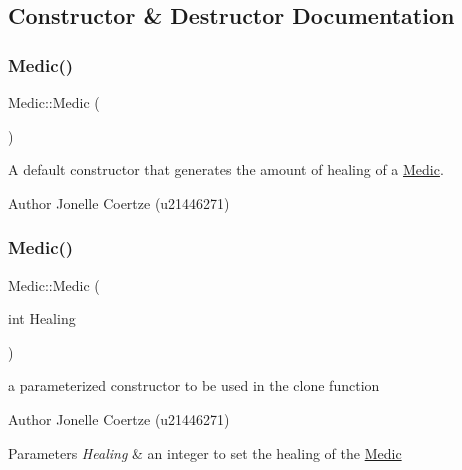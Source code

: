 \subsection{Constructor \& Destructor Documentation}
\mbox{\label{class_medic_a6bd1946f4e44fe417380daf53d70eb17}} 
\subsubsection{\texorpdfstring{Medic()}{Medic()}\hspace{0.1cm}{\footnotesize\ttfamily [1/2]}}
{\footnotesize\ttfamily Medic\+::\+Medic (\begin{DoxyParamCaption}{ }\end{DoxyParamCaption})}



A default constructor that generates the amount of healing of a \mbox{\hyperlink{class_medic}{Medic}}. 

\begin{DoxyAuthor}{Author}
Jonelle Coertze (u21446271) 
\end{DoxyAuthor}
\mbox{\label{class_medic_a75c6387c59af4a70cccad2f449b1fb21}} 
\subsubsection{\texorpdfstring{Medic()}{Medic()}\hspace{0.1cm}{\footnotesize\ttfamily [2/2]}}
{\footnotesize\ttfamily Medic\+::\+Medic (\begin{DoxyParamCaption}\item[{int}]{Healing }\end{DoxyParamCaption})}



a parameterized constructor to be used in the clone function 

\begin{DoxyAuthor}{Author}
Jonelle Coertze (u21446271) 
\end{DoxyAuthor}

\begin{DoxyParams}{Parameters}
{\em Healing} & an integer to set the healing of the \mbox{\hyperlink{class_medic}{Medic}} \\
\hline
\end{DoxyParams}


